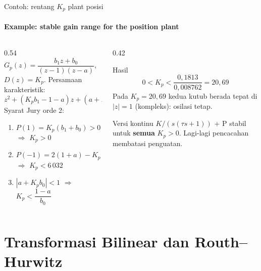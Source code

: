 \documentclass[aspectratio=169,10pt]{beamer}
\begin{document}
\begin{frame}{Contoh: rentang $K_p$ plant posisi}
	\framesubtitle{Example: stable gain range for the position plant}
	\begin{columns}[T]
		\begin{column}{0.54\textwidth}
			\small
			$G_p(z) = \dfrac{b_1z+b_0}{(z-1)(z-a)}$, $D(z)=K_p$. Persamaan karakteristik:
			\[
				z^2 + (K_pb_1 - 1 - a)z + (a + K_pb_0) = 0
			\]
			Syarat Jury orde 2:
			\begin{enumerate}
				\item $P(1) = K_p(b_1+b_0) > 0$ $\Rightarrow$ $K_p > 0$
				\item $P(-1) = 2(1+a) - K_p(b_1-b_0) > 0$ $\Rightarrow$ $K_p < 6\,032$
				\item $|a + K_pb_0| < 1$ $\Rightarrow$ $K_p < \dfrac{1-a}{b_0}$
			\end{enumerate}
		\end{column}
		\begin{column}{0.42\textwidth}
			\begin{block}{Hasil}
				\small
				\[
					0 < K_p < \frac{0{,}1813}{0{,}008762} = 20{,}69
				\]
				Pada $K_p = 20{,}69$ kedua kutub berada tepat di $|z|=1$ (kompleks): osilasi tetap.
			\end{block}
			\small Versi kontinu $K/(s(\tau s+1))$ + P stabil untuk \textbf{semua} $K_p>0$. Lagi-lagi pencacahan membatasi penguatan.
		\end{column}
	\end{columns}
\end{frame}

\section{Transformasi Bilinear dan Routh--Hurwitz\texorpdfstring{\\[4pt]{\Large{}}}{ / Bilinear Transformation and Routh-Hurwitz}}
\end{document}
